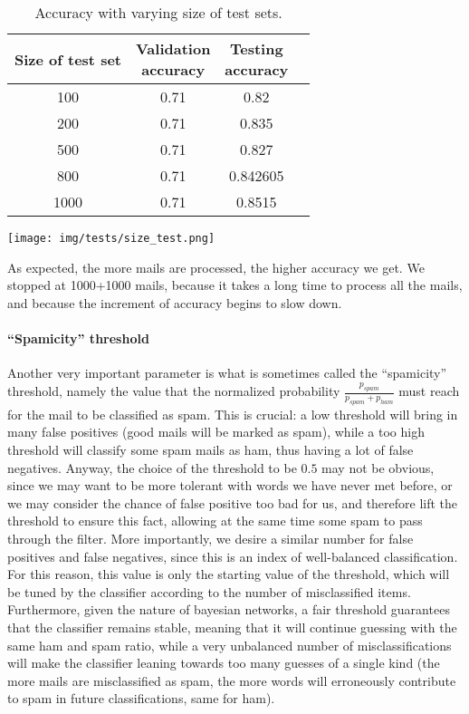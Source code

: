 \begin{center}
\begin{table}[h]
\begin{minipage}{.5\linewidth}
\begin{tabular}{cccc}
\toprule
Size of test set & \shortstack{Validation\\ accuracy} & \shortstack{Testing\\ accuracy}\\
\midrule
100  & 0.71 & 0.82     \\
200  & 0.71   & 0.835    \\
500  & 0.71 & 0.827    \\
800  & 0.71 & 0.842605 \\
1000 & 0.71   & 0.8515   \\
\bottomrule
\end{tabular}
\end{minipage}
\begin{minipage}{.5\linewidth}
\texttt{[image: img/tests/size\_test.png]}
    \label{fig:sizetest}
\end{minipage}
\caption{Accuracy with varying size of test sets.}
\end{table}
\label{tab:sizetest}
\end{center}

As expected, the more mails are processed, the higher accuracy we get. We stopped at 1000+1000 mails, because it takes a long time to process all the mails, and because the increment of accuracy begins to slow down.

\paragraph{``Spamicity'' threshold}
\label{spamthrtest} Another very important parameter is what is sometimes called the ``spamicity'' threshold, namely the value that the normalized probability $\frac{p_{spam}}{p_{spam} + p_{ham}}$ must reach for the mail to be classified as spam. This is crucial: a low threshold will bring in many false positives (good mails will be marked as spam), while a too high threshold will classify some spam mails as ham, thus having a lot of false negatives. Anyway, the choice of the threshold to be $0.5$ may not be obvious, since we may want to be more tolerant with words we have never met before, or we may consider the chance of false positive too bad for us, and therefore lift the threshold to ensure this fact, allowing at the same time some spam to pass through the filter. More importantly, we desire a similar number for false positives and false negatives, since this is an index of well-balanced classification. For this reason, this value is only the starting value of the threshold, which will be tuned by the classifier according to the number of misclassified items. Furthermore, given the nature of bayesian networks, a fair threshold guarantees that the classifier remains stable, meaning that it will continue guessing with the same ham and spam ratio, while a very unbalanced number of misclassifications will make the classifier leaning towards too many guesses of a single kind (the more mails are misclassified as spam, the more words will erroneously contribute to spam in future classifications, same for ham).

